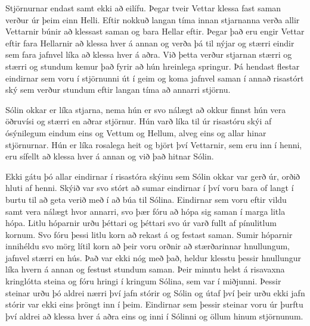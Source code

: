 \documentclass[ebook,11pt,oneside,openany]{memoir}
\begin{document}
\bigskip

Stjörnurnar endast samt ekki að eilífu. Þegar tveir Vettar klessa fast saman verður úr þeim einn Helli. Eftir nokkuð langan tíma innan stjarnanna verða allir Vettarnir búnir að klessast saman og bara Hellar eftir. Þegar það eru engir Vettar eftir fara Hellarnir að klessa hver á annan og verða þá til nýjar og stærri eindir sem fara jafnvel líka að klessa hver á aðra. Við þetta verður stjarnan stærri og stærri og stundum kemur það fyrir að hún hreinlega springur. Þá hendast flestar eindirnar sem voru í stjörnunni út í geim og koma jafnvel saman í annað risastórt ský sem verður stundum eftir langan tíma að annarri stjörnu.

Sólin okkar er líka stjarna, nema hún er svo nálægt að okkur finnst hún vera öðruvísi og stærri en aðrar stjörnur. Hún varð líka til úr risastóru skýi af ósýnilegum eindum eins og Vettum og Hellum, alveg eins og allar hinar stjörnurnar. Hún er líka rosalega heit og björt því Vettarnir, sem eru inn í henni, eru sífellt að klessa hver á annan og við það hitnar Sólin.

Ekki gátu þó allar eindirnar í risastóra skýinu sem Sólin okkar var gerð úr, orðið hluti af henni. Skýið var svo stórt að sumar eindirnar í því voru bara of langt í burtu til að geta verið með í að búa til Sólina. Eindirnar sem voru eftir vildu samt vera nálægt hvor annarri, svo þær fóru að hópa sig saman í marga litla hópa. Litlu hóparnir urðu þéttari og þéttari svo úr varð fullt af pínulitlum kornum. Svo fóru þessi litlu korn að rekast á og festast saman. Sumir hóparnir innihéldu svo mörg lítil korn að þeir voru orðnir að stærðarinnar hnullungum, jafnvel stærri en hús. Það var ekki nóg með það, heldur klesstu þessir hnullungur líka hvern á annan og festust stundum saman. Þeir minntu helst á risavaxna kringlótta steina og fóru hringi í kringum Sólina, sem var í miðjunni. Þessir steinar urðu þó aldrei nærri því jafn stórir og Sólin og útaf því þeir urðu ekki jafn stórir var ekki eins þröngt inn í þeim. Eindirnar sem þessir steinar voru úr þurftu því aldrei að klessa hver á aðra eins og inni í Sólinni og öllum hinum stjörnunum.
\end{document}
